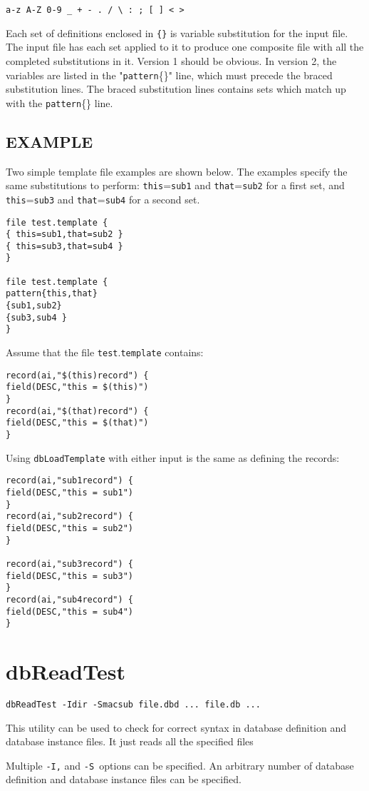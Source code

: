 \begin{verbatim}a-z A-Z 0-9 _ + - . / \ : ; [ ] < >
\end{verbatim}Each set of definitions enclosed in \verb|{}| is variable substitution for the input file. The input file has each set applied to it to 
produce one composite file with all the completed substitutions in it. Version 1 should be obvious. In version 2, the 
variables are listed in the "\verb|pattern|\{\}" line, which must precede the braced substitution lines. The braced substitution 
lines contains sets which match up with the \verb|pattern|\{\} line.

\subsection{EXAMPLE}

Two simple template file examples are shown below. The examples specify the same substitutions to perform: 
\verb|this|=\verb|sub1| and \verb|that|=\verb|sub2| for a first set, and \verb|this|=\verb|sub3| and \verb|that|=\verb|sub4| for a second set. 

\begin{verbatim}file test.template {
{ this=sub1,that=sub2 }
{ this=sub3,that=sub4 }
}

file test.template {
pattern{this,that}
{sub1,sub2}
{sub3,sub4 }
}
\end{verbatim}Assume that the file \verb|test|.\verb|template| contains:

\begin{verbatim}record(ai,"$(this)record") {
field(DESC,"this = $(this)")
}
record(ai,"$(that)record") {
field(DESC,"this = $(that)")
}
\end{verbatim}

Using \verb|dbLoadTemplate| with either input is the same as defining the records:

\begin{verbatim}record(ai,"sub1record") {
field(DESC,"this = sub1")
}
record(ai,"sub2record") {
field(DESC,"this = sub2")
}

record(ai,"sub3record") {
field(DESC,"this = sub3")
}
record(ai,"sub4record") {
field(DESC,"this = sub4")
}
\end{verbatim}\section{dbReadTest}

\begin{verbatim}dbReadTest -Idir -Smacsub file.dbd ... file.db ...
\end{verbatim}This utility can be used to check for correct syntax in database definition and database instance files. It just reads all the 
specified files

Multiple \verb|-I,| and \verb|-S |options can be specified. An arbitrary number of database definition and database instance files can 
be specified.








